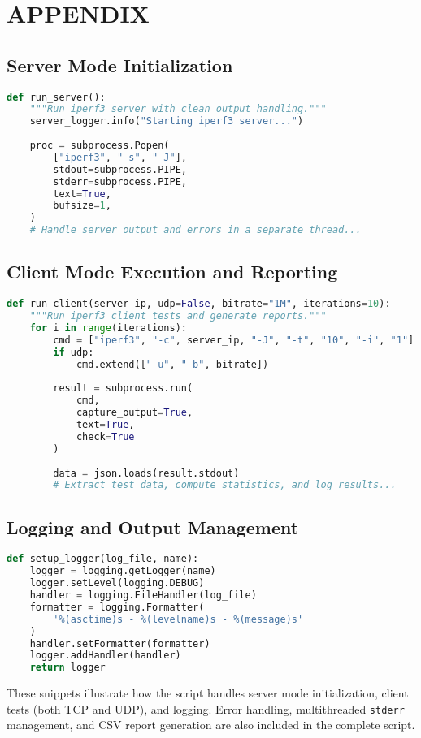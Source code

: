 
\section{APPENDIX} \label{sec:appendix}

\subsection*{Server Mode Initialization}

\begin{lstlisting}[language=Python, caption={Excerpt for server mode initialization.}]
def run_server():
    """Run iperf3 server with clean output handling."""
    server_logger.info("Starting iperf3 server...")
    
    proc = subprocess.Popen(
        ["iperf3", "-s", "-J"],
        stdout=subprocess.PIPE,
        stderr=subprocess.PIPE,
        text=True,
        bufsize=1,
    )
    # Handle server output and errors in a separate thread...
\end{lstlisting}

\subsection*{Client Mode Execution and Reporting}

\begin{lstlisting}[language=Python, caption={Excerpt for client mode execution.}]
def run_client(server_ip, udp=False, bitrate="1M", iterations=10):
    """Run iperf3 client tests and generate reports."""
    for i in range(iterations):
        cmd = ["iperf3", "-c", server_ip, "-J", "-t", "10", "-i", "1"]
        if udp:
            cmd.extend(["-u", "-b", bitrate])
        
        result = subprocess.run(
            cmd,
            capture_output=True,
            text=True,
            check=True
        )
        
        data = json.loads(result.stdout)
        # Extract test data, compute statistics, and log results...
\end{lstlisting}

\subsection*{Logging and Output Management}

\begin{lstlisting}[language=Python, caption={Excerpt for logging setup.}]
def setup_logger(log_file, name):
    logger = logging.getLogger(name)
    logger.setLevel(logging.DEBUG)
    handler = logging.FileHandler(log_file)
    formatter = logging.Formatter(
        '%(asctime)s - %(levelname)s - %(message)s'
    )
    handler.setFormatter(formatter)
    logger.addHandler(handler)
    return logger
\end{lstlisting}

These snippets illustrate how the script handles server mode initialization, client tests (both TCP and UDP), and logging. Error handling, multithreaded \texttt{stderr} management, and CSV report generation are also included in the complete script.